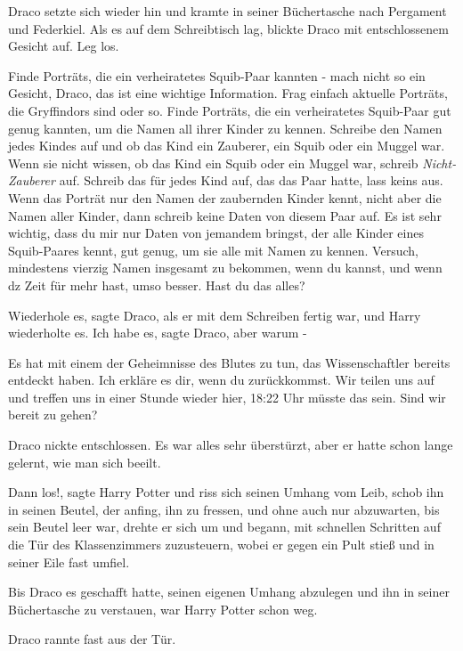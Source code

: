 Draco setzte sich wieder hin und kramte in seiner Büchertasche nach Pergament
und Federkiel. Als es auf dem Schreibtisch lag, blickte Draco mit entschlossenem
Gesicht auf. \glqq Leg los.\grqq{}

\glqq Finde Porträts, die ein verheiratetes Squib-Paar kannten - mach nicht so
ein Gesicht, Draco, das ist eine wichtige Information. Frag einfach aktuelle
Porträts, die Gryffindors sind oder so. Finde Porträts, die ein verheiratetes
Squib-Paar gut genug kannten, um die Namen all ihrer Kinder zu kennen. Schreibe
den Namen jedes Kindes auf und ob das Kind ein Zauberer, ein Squib oder ein
Muggel war. Wenn sie nicht wissen, ob das Kind ein Squib oder ein Muggel war,
schreib \emph{\glqq Nicht-Zauberer\grqq{} } auf. Schreib das für jedes Kind auf,
das das Paar hatte, lass keins aus. Wenn das Porträt nur den Namen der
zaubernden Kinder kennt, nicht aber die Namen aller Kinder, dann schreib keine
Daten von diesem Paar auf. Es ist sehr wichtig, dass du mir nur Daten von
jemandem bringst, der alle Kinder eines Squib-Paares kennt, gut genug, um sie
alle mit Namen zu kennen. Versuch, mindestens vierzig Namen insgesamt zu
bekommen, wenn du kannst, und wenn dz Zeit für mehr hast, umso besser. Hast du
das alles?\grqq{}

\glqq Wiederhole es\grqq{}, sagte Draco, als er mit dem Schreiben fertig war,
und Harry wiederholte es. \glqq Ich habe es\grqq{}, sagte Draco, \glqq aber
warum -\grqq{}

\glqq Es hat mit einem der Geheimnisse des Blutes zu tun, das Wissenschaftler
bereits entdeckt haben. Ich erkläre es dir, wenn du zurückkommst. Wir teilen uns
auf und treffen uns in einer Stunde wieder hier, 18:22 Uhr müsste das sein. Sind
wir bereit zu gehen?\grqq{}

Draco nickte entschlossen. Es war alles sehr überstürzt, aber er hatte schon
lange gelernt, wie man sich beeilt.

\glqq Dann los!\grqq{}, sagte Harry Potter und riss sich seinen Umhang vom Leib,
schob ihn in seinen Beutel, der anfing, ihn zu fressen, und ohne auch nur
abzuwarten, bis sein Beutel leer war, drehte er sich um und begann, mit
schnellen Schritten auf die Tür des Klassenzimmers zuzusteuern, wobei er gegen
ein Pult stieß und in seiner Eile fast umfiel.

Bis Draco es geschafft hatte, seinen eigenen Umhang abzulegen und ihn in seiner
Büchertasche zu verstauen, war Harry Potter schon weg.

Draco rannte fast aus der Tür.
